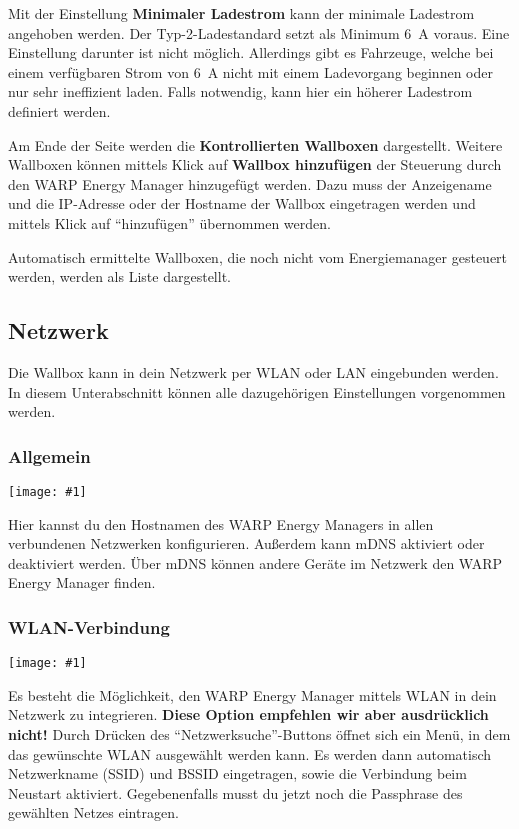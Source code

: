 \documentclass[a4paper,10pt]{article}
\newcommand{\gfx}[1]{\texttt{[image: \#1]}}
\begin{document}
\begin{multicols*}{2}
	Mit der Einstellung \textbf{Minimaler Ladestrom} kann der minimale Ladestrom
	angehoben werden. Der Typ-2-Ladestandard setzt als Minimum \SI{6}{\ampere} voraus. Eine
	Einstellung darunter ist nicht möglich. Allerdings gibt es Fahrzeuge, welche
	bei einem verfügbaren Strom von \SI{6}{\ampere} nicht mit einem Ladevorgang beginnen
	oder nur sehr ineffizient laden. Falls notwendig, kann hier ein höherer Ladestrom definiert werden.

	Am Ende der Seite werden die \textbf{Kontrollierten
	Wallboxen} dargestellt. Weitere Wallboxen können mittels Klick auf
	\textbf{Wallbox hinzufügen} der Steuerung durch den WARP Energy Manager
	hinzugefügt werden. Dazu muss der Anzeigename und die IP-Adresse oder der
	Hostname der Wallbox eingetragen werden und mittels Klick auf \enquote{hinzufügen} übernommen werden.

	Automatisch ermittelte Wallboxen, die noch nicht vom Energiemanager
	gesteuert werden, werden als Liste dargestellt.

	\subsection{Netzwerk}
	\label{network}
	Die Wallbox kann in dein Netzwerk per WLAN oder LAN eingebunden werden.
	In diesem Unterabschnitt können alle dazugehörigen Einstellungen vorgenommen werden.

	\subsubsection{Allgemein}

	\gfx{./img/resized/web_network}

	Hier kannst du den Hostnamen des WARP Energy Managers in allen verbundenen Netzwerken konfigurieren. Außerdem kann mDNS aktiviert oder deaktiviert werden.
	Über mDNS können andere Geräte im Netzwerk den WARP Energy Manager finden.


	\subsubsection{WLAN-Verbindung}
	\gfx{./img/resized/web_wifi_sta}

	Es besteht die Möglichkeit, den WARP Energy Manager mittels WLAN in dein Netzwerk
	zu integrieren. \textbf{Diese Option empfehlen wir aber ausdrücklich
	nicht!}
	Durch Drücken des \enquote{Netzwerksuche}-Buttons öffnet sich ein Menü, in dem das gewünschte WLAN ausgewählt werden kann.
	Es werden dann automatisch Netzwerkname (SSID) und BSSID eingetragen, sowie die Verbindung beim Neustart aktiviert.
	Gegebenenfalls musst du jetzt noch die Passphrase des gewählten Netzes eintragen.


\end{multicols*}
\end{document}

